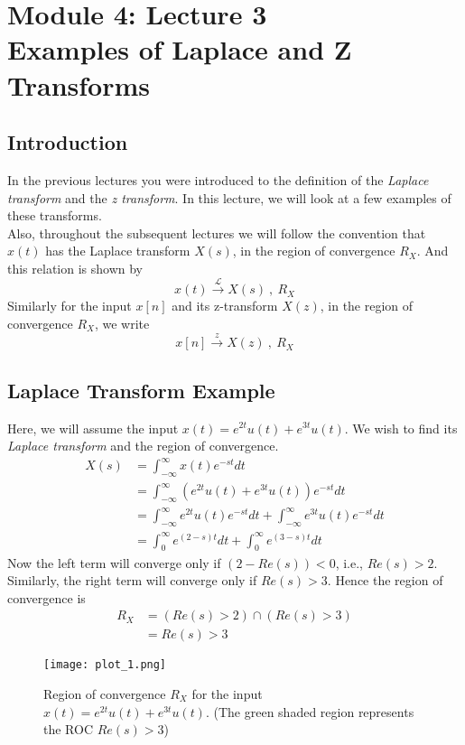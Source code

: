\section{Module 4: Lecture 3\\Examples of Laplace and Z Transforms}


\subsection{Introduction}
In the previous lectures you were introduced to the definition of the \textit{Laplace transform} and the \textit{z transform}. In this lecture, we will look at a few examples of these transforms.\\
Also, throughout the subsequent lectures we will follow the convention that $x(t)$ has the Laplace transform $X(s)$, in the region of convergence $R_X$. And this relation is shown by
\[
x(t) \xrightarrow{\ \mathcal{L}\ } X(s)\ ,\ R_X
\]Similarly for the input $x[n]$ and its z-transform $X(z)$, in the region of convergence $R_X$, we write
\[
x[n] \xrightarrow{\ z\ } X(z)\ ,\ R_X
\]
\subsection{Laplace Transform Example}
Here, we will assume the input $x(t) = e^{2t}u(t) + e^{3t}u(t)$. We wish to find its \textit{Laplace transform} and the region of convergence.
\begin{align*}
	X(s) &= \int_{-\infty}^{\infty}{x(t)e^{-st}dt}\\
	 &= \int_{-\infty}^{\infty}{(e^{2t}u(t) + e^{3t}u(t))e^{-st}dt}\\
	 &= \int_{-\infty}^{\infty}{e^{2t}u(t)e^{-st}dt} + \int_{-\infty}^{\infty}{e^{3t}u(t)e^{-st}dt}\\
	 &= \int_{0}^{\infty}{e^{(2-s)t}dt} + \int_{0}^{\infty}{e^{(3-s)t}dt}
\end{align*}
Now the left term will converge only if $(2 - Re(s)) < 0$, i.e., $Re(s) > 2$. Similarly, the right term will converge only if $Re(s) > 3$. Hence the region of convergence is
\begin{align*}
	R_X &= (Re(s) > 2) \cap (Re(s) > 3) \\
	&= Re(s) > 3
\end{align*}

\begin{figure}[h!]
\begin{center}
\texttt{[image: plot\_1.png]}
\end{center}
\caption{Region of convergence $R_X$ for the input  $x(t) = e^{2t}u(t) + e^{3t}u(t)$. (The green shaded region represents the ROC $Re(s) > 3$)}
\end{figure}

